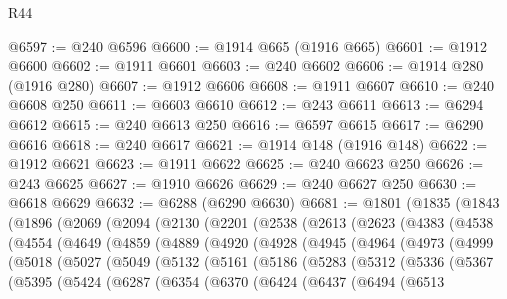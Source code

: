 \begin{lexlean}{R44}
\begin{coremodule}
{@6597 := @240 @6596
@6600 := @1914 @665 (@1916 @665)
@6601 := @1912 @6600
@6602 := @1911 @6601
@6603 := @240 @6602
@6606 := @1914 @280 (@1916 @280)
@6607 := @1912 @6606
@6608 := @1911 @6607
@6610 := @240 @6608 @250
@6611 := @6603 @6610
@6612 := @243 @6611
@6613 := @6294 @6612
@6615 := @240 @6613 @250
@6616 := @6597 @6615
@6617 := @6290 @6616
@6618 := @240 @6617
@6621 := @1914 @148 (@1916 @148)
@6622 := @1912 @6621
@6623 := @1911 @6622
@6625 := @240 @6623 @250
@6626 := @243 @6625
@6627 := @1910 @6626
@6629 := @240 @6627 @250
@6630 := @6618 @6629
@6632 := @6288 (@6290 @6630)
@6681 := @1801
    (@1835
      (@1843
        (@1896
          (@2069
            (@2094
              (@2130
                (@2201
                  (@2538
                    (@2613
                      (@2623
                        (@4383
                          (@4538
                            (@4554
                              (@4649
                                (@4859
                                  (@4889
                                    (@4920
                                      (@4928
                                        (@4945
                                          (@4964
                                            (@4973
                                              (@4999
                                                (@5018
                                                  (@5027
                                                    (@5049
                                                      (@5132
                                                        (@5161
                                                          (@5186
                                                            (@5283
                                                              (@5312
                                                                (@5336
                                                                  (@5367
                                                                    (@5395
                                                                      (@5424
                                                                        (@6287
                                                                          (@6354
                                                                            (@6370
                                                                              (@6424
                                                                                (@6437
                                                                                  (@6494
                                                                                    (@6513
}
\end{coremodule}
\end{lexlean}
